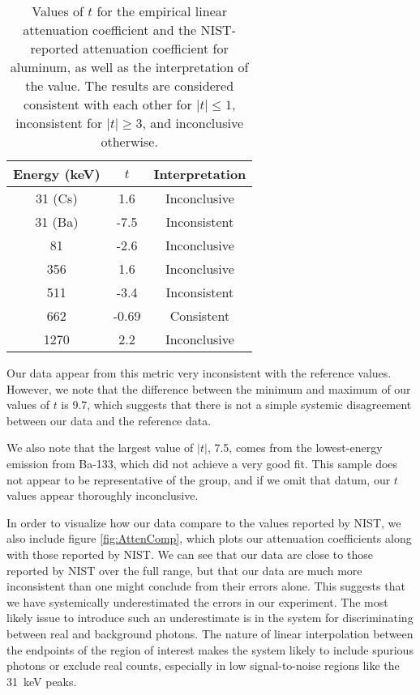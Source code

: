 \documentclass[letter]{article}
\begin{document}
\begin{table}[h] 
\centering  \begin{tabular}{ c  c   c  } 
Energy (\unit{\kilo\electronvolt}) & $t$ & Interpretation  \\ \hline
31 (Cs) & 1.6 & Inconclusive \\ 
31 (Ba) &  -7.5 & Inconsistent \\
81 &  -2.6 & Inconclusive \\
356 &  1.6 & Inconclusive \\
511 &  -3.4 & Inconsistent \\
662 &  -0.69 & Consistent \\
1270 &  2.2 & Inconclusive 
\end{tabular}
\caption{Values of $t$ for the empirical linear attenuation coefficient and the NIST-reported attenuation coefficient for aluminum, as well as the interpretation of the value. The results are considered consistent with each other for $|t| \leq 1$, inconsistent for $|t|\geq3$, and inconclusive otherwise.}
\label{tab:tValues}
\end{table}

Our data appear from this metric very inconsistent with the reference values. However, we note that the difference between the minimum and maximum of our values of $t$ is 9.7, which suggests that there is not a simple systemic disagreement between our data and the reference data.

We also note that the largest value of $|t|$, 7.5, comes from the lowest-energy emission from Ba-133, which did not achieve a very good fit. This sample does not appear to be representative of the group, and if we omit that datum, our $t$ values appear thoroughly inconclusive.

In order to visualize how our data compare to the values reported by NIST, we also include figure \ref{fig:AttenComp}, which plots our attenuation coefficients along with those reported by NIST. We can see that our data are close to those reported by NIST over the full range, but that our data are much more inconsistent than one might conclude from their errors alone. This suggests that we have systemically underestimated the errors in our experiment. The most likely issue to introduce such an underestimate is in the system for discriminating between real and background photons. The nature of linear interpolation between the endpoints of the region of interest makes the system likely to include spurious photons or exclude real counts, especially in low signal-to-noise regions like the \qty{31}{\kilo\electronvolt} peaks.
\end{document}

